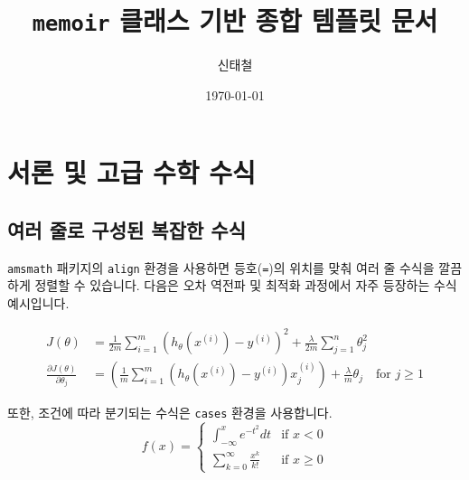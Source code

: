 \documentclass[11pt,a4paper,oneside]{memoir}
\title{\texttt{memoir} 클래스 기반 종합 템플릿 문서}
\author{신태철}
\date{\today}
\begin{document}
\maketitle
\tableofcontents
\newpage

\chapter{서론 및 고급 수학 수식}

\section{여러 줄로 구성된 복잡한 수식}
\texttt{amsmath} 패키지의 \texttt{align} 환경을 사용하면 등호(\texttt{=})의 위치를 맞춰 여러 줄 수식을 깔끔하게 정렬할 수 있습니다. 다음은 오차 역전파 및 최적화 과정에서 자주 등장하는 수식 예시입니다.

\begin{align}
    J(\theta) &= \frac{1}{2m} \sum_{i=1}^{m} \left( h_\theta(x^{(i)}) - y^{(i)} \right)^2 + \frac{\lambda}{2m} \sum_{j=1}^{n} \theta_j^2 \\
    \frac{\partial J(\theta)}{\partial \theta_j} &= \left( \frac{1}{m} \sum_{i=1}^{m} \left( h_\theta(x^{(i)}) - y^{(i)} \right) x_j^{(i)} \right) + \frac{\lambda}{m} \theta_j \quad \text{for } j \ge 1
\end{align}

또한, 조건에 따라 분기되는 수식은 \texttt{cases} 환경을 사용합니다.
\begin{equation}
    f(x) = \begin{cases}
        \int_{-\infty}^{x} e^{-t^2} dt & \text{if } x < 0 \\
        \sum_{k=0}^{\infty} \frac{x^k}{k!} & \text{if } x \ge 0
    \end{cases}
\end{equation}
\end{document}
